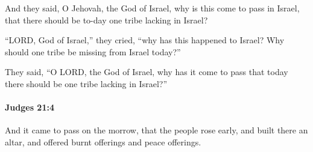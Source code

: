 			\begin{versebox}
					\item[BHS] 
					\item[ASV] And they said, O Jehovah, the God of Israel, why is this come to pass in Israel, that there should be to-day one tribe lacking in Israel?
					\item[NIV] “LORD, God of Israel,” they cried, “why has this happened to Israel? Why should one tribe be missing from Israel today?”
					\item[NRSV] They said, “O LORD, the God of Israel, why has it come to pass that today there should be one tribe lacking in Israel?”
			\end{versebox}

		\paragraph{Judges 21:4} %
			\label{JUDGES-21-4}

			And it came to pass on the morrow, that the people rose early, and built there an altar, and offered burnt offerings and peace offerings.

